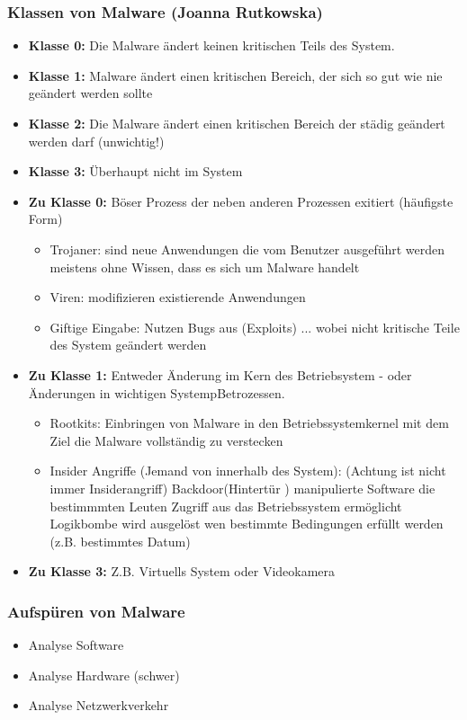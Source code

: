 \documentclass[a4paper,10pt]{scrartcl}
\begin{document}
\subsubsection{Klassen von Malware (Joanna Rutkowska)}
\begin{itemize}
 \item \textbf{Klasse 0: } Die Malware ändert keinen kritischen Teils des System.
 \item \textbf{Klasse 1: } Malware ändert einen kritischen Bereich, der sich so gut wie nie geändert werden sollte 
 \item \textbf{Klasse 2: } Die Malware ändert einen kritischen Bereich der städig geändert werden darf (unwichtig!) 
 \item \textbf{Klasse 3: } Überhaupt nicht im System
 \item \textbf{Zu Klasse 0: } Böser Prozess der neben anderen Prozessen exitiert (häufigste Form)
                              \begin{itemize}
                               \item Trojaner: sind neue Anwendungen die vom Benutzer ausgeführt werden meistens ohne Wissen, dass 
                               es sich um Malware handelt
                               \item Viren: modifizieren existierende Anwendungen 
                               \item Giftige Eingabe: Nutzen Bugs aus (Exploits) ... wobei nicht kritische Teile des System geändert
                               werden
                              \end{itemize}

 \item \textbf{Zu Klasse 1: } Entweder Änderung im Kern des Betriebsystem - oder Änderungen in wichtigen SystempBetrozessen.
                               \begin{itemize}
                               \item Rootkits: Einbringen von Malware in den Betriebssystemkernel mit dem Ziel die Malware vollständig zu verstecken
                               \item Insider Angriffe (Jemand von innerhalb des System): (Achtung ist nicht immer Insiderangriff) Backdoor(Hintertür ) manipulierte Software die bestimmmten Leuten Zugriff 
                               aus das Betriebssystem ermöglicht\\
                                   Logikbombe wird ausgelöst wen bestimmte Bedingungen erfüllt werden (z.B. bestimmtes Datum) 
                              \end{itemize}
                              
 \item \textbf{Zu Klasse 3: } Z.B. Virtuells System oder Videokamera
\end{itemize}

\subsubsection{Aufspüren von Malware}
\begin{itemize}
 \item Analyse Software
 \item Analyse Hardware (schwer)
 \item Analyse Netzwerkverkehr
\end{itemize}
\end{document}
